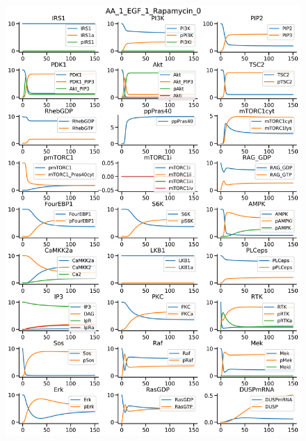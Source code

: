 \documentclass{beamer}
\begin{document}
\begin{frame}
\begin{figure}
\begin{minipage}{0.45\textwidth}
        \centering
        \includegraphics[width=\textwidth]{../simulations/ExtendedPI3KModel/validations/AAWithEGFWithRapamycin/AA_1_EGF_1_Rapamycin_0-6.png}
    \end{minipage}
\end{figure}
\end{frame}

\end{document}
